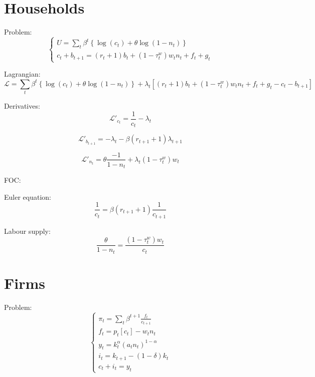 \documentclass[12pt]{extreport}
\begin{document}
\section{Households}
	Problem:
		\begin{equation}
			\left\{
			\begin{array}{l}
			U = \sum_t \beta^t \left\{   \log \left( c_t \right) + \theta  \log \left( 1 - n_t \right)  \right\} \\
			c_t  + b_{t+1} = (r_t +1)b_t + (1-\tau^w_t) w_t n_t + f_t + g_t
			\end{array}
			\right.
		\end{equation}
		
	Lagrangian:
		\begin{equation}
			\mathcal{L} = \sum_t \beta^t \left\{   \log \left( c_t \right) + \theta  \log \left( 1 - n_t \right)  \right\} + 
			\lambda_t \left[ (r_t +1)b_t + (1-\tau^w_t) w_t n_t + f_t + g_t - c_t  - b_{t+1}  \right]
		\end{equation}
		
	Derivatives:
		\begin{equation}
		\mathcal{L}'_{c_t} =  \frac{1}{c_t} - \lambda_t 
		\end{equation}
		
		\begin{equation}
		\mathcal{L}'_{b_{t+1}} = - \lambda_t  - \beta (r_{t+1} +1) \lambda_{t+1}
		\end{equation}
		
		\begin{equation}
		\mathcal{L}'_{n_t} =  \theta \frac{-1}{1-n_t} + \lambda_t (1-\tau^w_t) w_t
		\end{equation}
		
	FOC:
	
		Euler equation:
		\begin{equation}
		\frac{1}{c_t } = \beta (r_{t+1} +1)  \frac{1}{c_{t+1} }
		\end{equation}
	
	
		Labour supply:
		\begin{equation}
		 \frac{\theta}{1-n_t} = \frac{ (1-\tau^w_t) w_t}{c_t}  
		\end{equation}

\section{Firms}

	Problem:
	\begin{equation}
		\left\{
		\begin{array}{l}
		\pi_t =  \sum_t \beta^{t+1} \frac{f_t}{c_{t+1}   } \\
		f_t = p_t \left[ c_t \right] - w_t n_t \\
		y_t = k_t^{\alpha} (a_t n_t)^{1-\alpha} \\
		i_t = k_{t+1} - (1-\delta) k_t \\
		c_t + i_t = y_t
		\end{array}
		\right.
	\end{equation}
\end{document}
